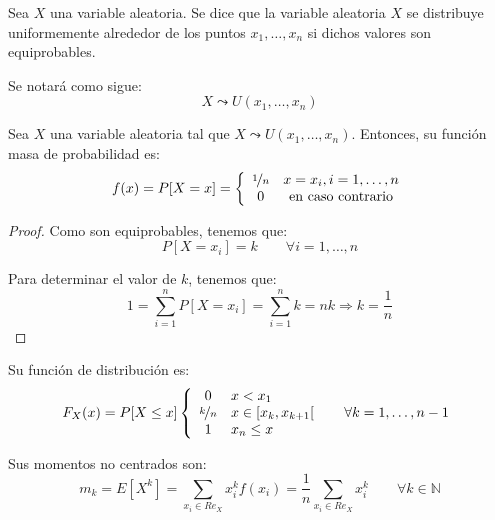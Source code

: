 \begin{definicion}
    Sea $X$ una variable aleatoria. Se dice que la variable aleatoria $X$ se distribuye uniformemente alrededor de los puntos $x_1,\dots, x_n$ si dichos valores son equiprobables.

    Se notará como sigue:
    \begin{equation*}
        X \leadsto U(x_1,\dots, x_n)
    \end{equation*}
\end{definicion}

\begin{prop}
    Sea $X$ una variable aleatoria tal que $X\leadsto U(x_1,\dots, x_n)$. Entonces, su función masa de probabilidad es:
    \begin{equation*}
        f(x) = P[X=x] = \left\{\begin{array}{cc}
            \nicefrac{1}{n} & x=x_i, i=1,\dots, n \\
            0 & \text{en caso contrario}
        \end{array}\right.
    \end{equation*}
\end{prop}
\begin{proof}
    Como son equiprobables, tenemos que:
    \begin{equation*}
        P[X=x_i] = k\qquad \forall i=1,\dots, n
    \end{equation*}

    Para determinar el valor de $k$, tenemos que:
    \begin{equation*}
        1 = \sum_{i=1}^n P[X=x_i] = \sum_{i=1}^n k = nk \Longrightarrow k = \frac{1}{n}
    \end{equation*}
\end{proof}

Su función de distribución es:
\begin{equation*}
    F_X(x) = P[X\leq x] \left\{\begin{array}{cl}
        0 & x<x_1 \\
        \nicefrac{k}{n} & x\in \left[x_k, x_{k+1}\right[ \qquad \forall k=1,\dots, n-1\\
        1 & x_n\leq x
    \end{array}\right.
\end{equation*}

Sus momentos no centrados son:
\begin{equation*}
    m_k = E[X^k]
    = \sum_{x_i\in Re_X}x_i^kf(x_i)
    = \frac{1}{n} \sum_{x_i\in Re_X}x_i^k
    \qquad \forall k\in \mathbb{N}
\end{equation*}

